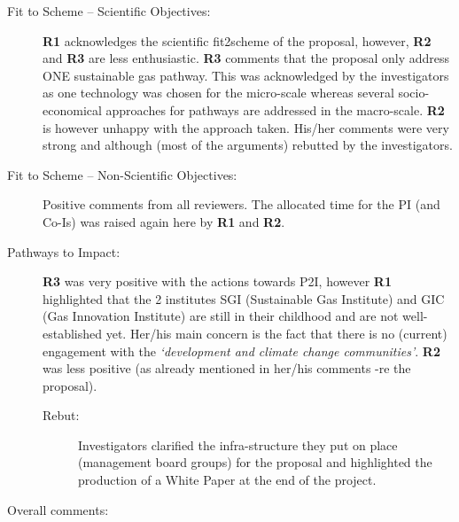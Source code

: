 \documentclass[14pt,twoside]{report}
\begin{document}
\begin{enumerate}[(i)]
       \begin{description}
          \item[Fit to Scheme -- Scientific Objectives:] {\bf R1} acknowledges the scientific fit2scheme of the proposal, however, {\bf R2} and {\bf R3} are less enthusiastic. {\bf R3} comments that the proposal only address ONE sustainable gas pathway. This was acknowledged by the investigators as one technology was chosen for the micro-scale whereas several socio-economical approaches for pathways are addressed in the macro-scale. {\bf R2} is however unhappy with the approach taken. His/her comments were very strong and although (most of the arguments) rebutted by the investigators.
%
          \item[Fit to Scheme -- Non-Scientific Objectives:] Positive comments from all reviewers. The allocated time for the PI (and Co-Is) was raised again here by {\bf R1} and {\bf R2}. 
%
          \item[Pathways to Impact:] {\bf R3} was very positive with the actions towards P2I, however {\bf R1} highlighted that the 2 institutes SGI (Sustainable Gas Institute) and GIC (Gas Innovation Institute) are still in their childhood and are not well-established yet. Her/his main concern is the fact that there is no (current) engagement with the {\it `development and climate change communities'}. {\bf R2} was less positive (as already mentioned in her/his comments -re the proposal). 
            \begin{description}
               \item[Rebut:] Investigators clarified the infra-structure they put on place (management board groups) for the proposal and highlighted the production of a White Paper at the end of the project.
            \end{description}
       \end{description}
     
%
\end{enumerate}

     \begin{center}
       {\large Overall comments:}
     \end{center}
\end{document}
